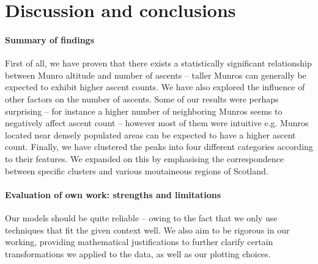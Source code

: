 \documentclass[11pt,a4paper]{article}
\begin{document}
\section{Discussion and conclusions}

\paragraph{Summary of findings}
First of all, we have proven that there exists a statistically significant relationship between Munro altitude and number of ascents – taller Munros can generally be expected to exhibit higher ascent counts. We have also explored the influence of other factors on the number of ascents. Some of our results were perhaps surprising – for instance a higher number of neighboring Munros seems to negatively affect ascent count – however most of them were intuitive e.g. Munros located near densely populated areas can be expected to have a higher ascent count. Finally, we have clustered the peaks into four different categories according to their features. We expanded on this by emphasising the correspondence between specific clusters and various moutaineous regions of Scotland.
\paragraph{Evaluation of own work: strengths and limitations}
Our models should be quite reliable – owing to the fact that we only use techniques that fit the given context well. We also aim to be rigorous in our working, providing mathematical justifications to further clarify certain transformations we applied to the data, as well as our plotting choices.
\end{document}
